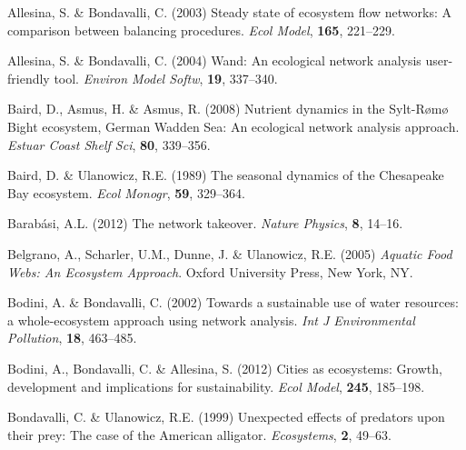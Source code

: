 \documentclass[11pt]{article}
\begin{document}
\begin{thebibliography}{79}
\providecommand{\natexlab}[1]{#1}

Allesina, S. \& Bondavalli, C. (2003) Steady state of ecosystem flow networks:
  A comparison between balancing procedures.
\newblock \emph{Ecol Model}, \textbf{165}, 221--229.

Allesina, S. \& Bondavalli, C. (2004) Wand: An ecological network analysis
  user-friendly tool.
\newblock \emph{Environ Model Softw}, \textbf{19}, 337--340.

Baird, D., Asmus, H. \& Asmus, R. (2008) Nutrient dynamics in the
  {S}ylt-{R}{\o}m{\o} {B}ight ecosystem, {German Wadden Sea}: An ecological
  network analysis approach.
\newblock \emph{Estuar Coast Shelf Sci}, \textbf{80}, 339--356.

Baird, D. \& Ulanowicz, R.E. (1989) The seasonal dynamics of the {Chesapeake
  Bay} ecosystem.
\newblock \emph{Ecol Monogr}, \textbf{59}, 329--364.

Barab{\'a}si, A.L. (2012) The network takeover.
\newblock \emph{Nature Physics}, \textbf{8}, 14--16.

Belgrano, A., Scharler, U.M., Dunne, J. \& Ulanowicz, R.E. (2005) \emph{Aquatic
  Food Webs: An Ecosystem Approach}.
\newblock Oxford University Press, New York, NY.

Bodini, A. \& Bondavalli, C. (2002) Towards a sustainable use of water
  resources: a whole-ecosystem approach using network analysis.
\newblock \emph{Int J Environmental Pollution}, \textbf{18}, 463--485.

Bodini, A., Bondavalli, C. \& Allesina, S. (2012) Cities as ecosystems: Growth,
  development and implications for sustainability.
\newblock \emph{Ecol Model}, \textbf{245}, 185--198.

Bondavalli, C. \& Ulanowicz, R.E. (1999) Unexpected effects of predators upon
  their prey: {T}he case of the {A}merican alligator.
\newblock \emph{Ecosystems}, \textbf{2}, 49--63.


\end{thebibliography}
\end{document}
